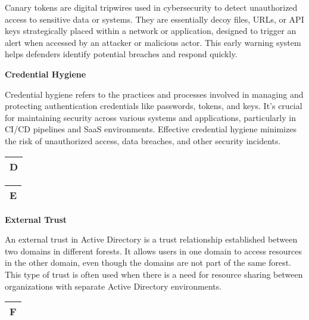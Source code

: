 Canary tokens are digital tripwires used in cybersecurity to detect unauthorized access to sensitive data or systems. They are essentially decoy files, URLs, or API keys strategically placed within a network or application, designed to trigger an alert when accessed by an attacker or malicious actor. This early warning system helps defenders identify potential breaches and respond quickly.

\textbf{Credential Hygiene}

Credential hygiene refers to the practices and processes involved in managing and protecting authentication credentials like passwords, tokens, and keys. It's crucial for maintaining security across various systems and applications, particularly in CI/CD pipelines and SaaS environments. Effective credential hygiene minimizes the risk of unauthorized access, data breaches, and other security incidents.

\begin{table}
\justifying

\begin{tabular}{l}
\textbf{D} \\
\hline

\end{tabular}

\end{table}

\begin{table}
\justifying

\begin{tabular}{l}
\textbf{E} \\
\hline

\end{tabular}

\end{table}

\textbf{External Trust}

An external trust in Active Directory is a trust relationship established between two domains in different forests. It allows users in one domain to access resources in the other domain, even though the domains are not part of the same forest. This type of trust is often used when there is a need for resource sharing between organizations with separate Active Directory environments.

\begin{table}
\justifying

\begin{tabular}{l}
\textbf{F} \\
\hline

\end{tabular}

\end{table}

